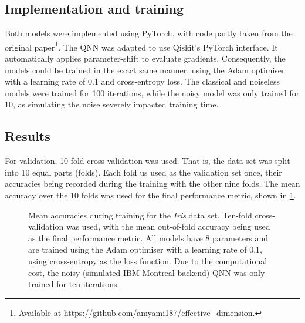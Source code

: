 \subsection{Implementation and training}
Both models were implemented using PyTorch, with code partly taken from the original paper\footnote{Available at \url{https://github.com/amyami187/effective_dimension}.}.
The QNN was adapted to use Qiskit's PyTorch interface.
It automatically applies parameter-shift to evaluate gradients.
Consequently, the models could be trained in the exact same manner, using the Adam optimiser with a learning rate of 0.1 and cross-entropy loss.
The classical and noiseless models were trained for 100 iterations, while the noisy model was only trained for 10, as simulating the noise severely impacted training time.

\subsection{Results}
For validation, 10-fold cross-validation was used.
That is, the data set was split into 10 equal parts (folds).
Each fold us used as the validation set once, their accuracies being recorded during the training with the other nine folds.
The mean accuracy over the 10 folds was used for the final performance metric, shown in \cref{fig:iris_training}.

\begin{figure}
    \centering
    \caption{
        Mean accuracies during training for the \textit{Iris} data set.
        Ten-fold cross-validation was used, with the mean out-of-fold accuracy being used as the final performance metric.
        All models have 8 parameters and are trained using the Adam optimiser with a learning rate of 0.1, using cross-entropy as the loss function.
        Due to the computational cost, the noisy (simulated IBM Montreal backend) QNN was only trained for ten iterations.
    }
    \label{fig:iris_training}
\end{figure}


